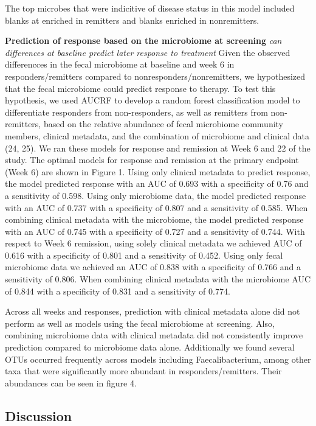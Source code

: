 \documentclass[11pt,]{article}
\begin{document}
The top microbes that were indicitive of disease status in this model
included blanks at enriched in remitters and blanks enriched in
nonremitters.

\textbf{Prediction of response based on the microbiome at screening}
\emph{can differences at baseline predict later response to treatment}
Given the observed differencces in the fecal microbiome at baseline and
week 6 in responders/remitters compared to nonresponders/nonremitters,
we hypothesized that the fecal microbiome could predict response to
therapy. To test this hypothesis, we used AUCRF to develop a random
forest classification model to differentiate responders from
non-responders, as well as remitters from non-remitters, based on the
relative abundance of fecal microbiome community members, clinical
metadata, and the combination of microbiome and clinical data (24, 25).
We ran these models for response and remission at Week 6 and 22 of the
study. The optimal models for response and remission at the primary
endpoint (Week 6) are shown in Figure 1. Using only clinical metadata to
predict response, the model predicted response with an AUC of 0.693 with
a specificity of 0.76 and a sensitivity of 0.598. Using only microbiome
data, the model predicted response with an AUC of 0.737 with a
specificity of 0.807 and a sensitivity of 0.585. When combining clinical
metadata with the microbiome, the model predicted response with an AUC
of 0.745 with a specificity of 0.727 and a sensitivity of 0.744. With
respect to Week 6 remission, using solely clinical metadata we achieved
AUC of 0.616 with a specificity of 0.801 and a sensitivity of 0.452.
Using only fecal microbiome data we achieved an AUC of 0.838 with a
specificity of 0.766 and a sensitivity of 0.806. When combining clinical
metadata with the microbiome AUC of 0.844 with a specificity of 0.831
and a sensitivity of 0.774.

Across all weeks and responses, prediction with clinical metadata alone
did not perform as well as models using the fecal microbiome at
screening. Also, combining microbiome data with clinical metadata did
not consistently improve prediction compared to microbiome data alone.
Additionally we found several OTUs occurred frequently across models
including Faecalibacterium, among other taxa that were significantly
more abundant in responders/remitters. Their abundances can be seen in
figure 4.

\subsection{Discussion}\label{discussion}
\end{document}
